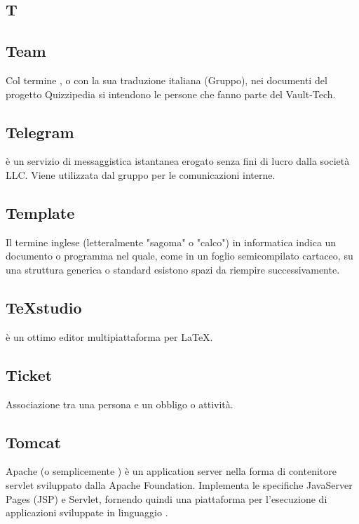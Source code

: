 \newpage

\begin{center}
\Huge\section*{\uppercase{T}}
\end{center}

\subsection*{Team}
Col termine , o con la sua traduzione italiana (Gruppo), nei documenti del progetto
Quizzipedia si intendono le persone che fanno parte del Vault-Tech.


\subsection*{Telegram}
 è un servizio di messaggistica istantanea erogato senza fini di lucro dalla società  LLC. Viene utilizzata dal gruppo per le comunicazioni interne.

\subsection*{Template}
Il termine inglese  (letteralmente "sagoma" o "calco") in informatica
indica un documento o programma nel quale, come in un foglio semicompilato
cartaceo, su una struttura generica o standard esistono spazi da riempire
successivamente.

\subsection*{TeXstudio}
 è un ottimo editor multipiattaforma per LaTeX.

\subsection*{Ticket}
Associazione tra una persona e un obbligo o attività.

\subsection*{Tomcat}
Apache  (o semplicemente ) è un application server nella forma di contenitore servlet  sviluppato dalla Apache  Foundation. Implementa le specifiche JavaServer Pages (JSP) e Servlet, fornendo quindi una piattaforma  per l'esecuzione di applicazioni  sviluppate in linguaggio . 

